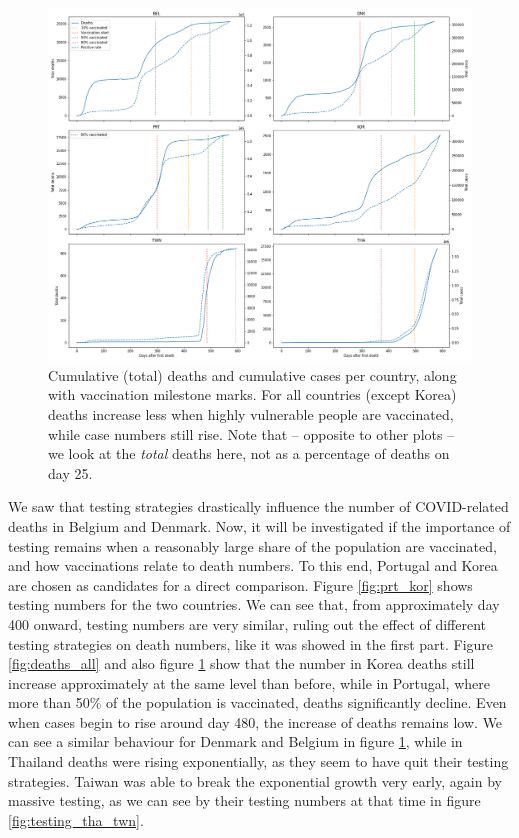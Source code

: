 \documentclass[a4paper,11pt]{article}
\begin{document}
\begin{figure}[htb]
    \centering
    \includegraphics[width=\textwidth]{figures/deaths_cases_6.png}
    \caption{Cumulative (total) deaths and cumulative cases per country, along with vaccination milestone marks. For all countries (except Korea) deaths increase less when highly vulnerable people are vaccinated, while case numbers still rise. Note that -- opposite to other plots -- we look at the \textit{total} deaths here, not as a percentage of deaths on day 25.}
    \label{fig:cases_deaths_all}
\end{figure}

We saw that testing strategies drastically influence the number of COVID-related deaths in Belgium and Denmark. Now, it will be investigated if the importance of testing remains when a reasonably large share of the population are vaccinated, and how vaccinations relate to death numbers.
To this end, Portugal and Korea are chosen as candidates for a direct comparison. Figure \ref{fig:prt_kor} shows testing numbers for the two countries. We can see that, from approximately day 400 onward, testing numbers are very similar, ruling out the effect of different testing strategies on death numbers, like it was showed in the first part. Figure \ref{fig:deaths_all} and also figure \ref{fig:cases_deaths_all} show that the number in Korea deaths still increase approximately at the same level than before, while in Portugal, where more than 50\% of the population is vaccinated, deaths significantly decline. Even when cases begin to rise around day 480, the increase of deaths remains low. We can see a similar behaviour for Denmark and Belgium in figure \ref{fig:cases_deaths_all}, while in Thailand deaths were rising exponentially, as they seem to have quit their testing strategies. Taiwan was able to break the exponential growth very early, again by massive testing, as we can see by their testing numbers at that time in figure \ref{fig:testing_tha_twn}.
\end{document}
